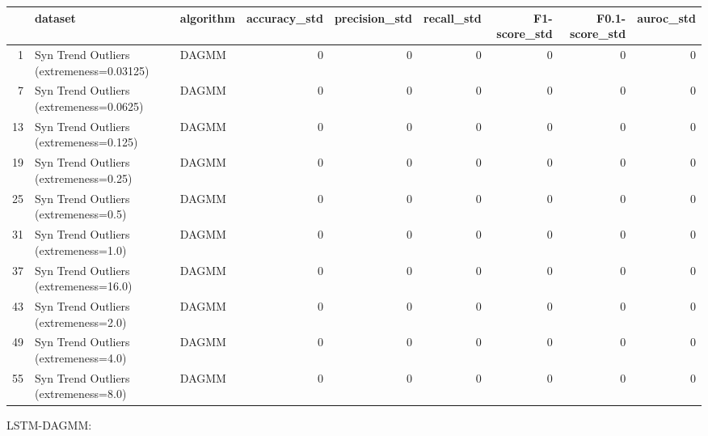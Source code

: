 \begin{tabular}{rllrrrrrr}
\hline
    & dataset                                  & algorithm   &   accuracy\_std &   precision\_std &   recall\_std &   F1-score\_std &   F0.1-score\_std &   auroc\_std \\
\hline
  1 & Syn Trend Outliers (extremeness=0.03125) & DAGMM       &              0 &               0 &            0 &              0 &                0 &           0 \\
  7 & Syn Trend Outliers (extremeness=0.0625)  & DAGMM       &              0 &               0 &            0 &              0 &                0 &           0 \\
 13 & Syn Trend Outliers (extremeness=0.125)   & DAGMM       &              0 &               0 &            0 &              0 &                0 &           0 \\
 19 & Syn Trend Outliers (extremeness=0.25)    & DAGMM       &              0 &               0 &            0 &              0 &                0 &           0 \\
 25 & Syn Trend Outliers (extremeness=0.5)     & DAGMM       &              0 &               0 &            0 &              0 &                0 &           0 \\
 31 & Syn Trend Outliers (extremeness=1.0)     & DAGMM       &              0 &               0 &            0 &              0 &                0 &           0 \\
 37 & Syn Trend Outliers (extremeness=16.0)    & DAGMM       &              0 &               0 &            0 &              0 &                0 &           0 \\
 43 & Syn Trend Outliers (extremeness=2.0)     & DAGMM       &              0 &               0 &            0 &              0 &                0 &           0 \\
 49 & Syn Trend Outliers (extremeness=4.0)     & DAGMM       &              0 &               0 &            0 &              0 &                0 &           0 \\
 55 & Syn Trend Outliers (extremeness=8.0)     & DAGMM       &              0 &               0 &            0 &              0 &                0 &           0 \\
\hline
\end{tabular}

LSTM-DAGMM:

